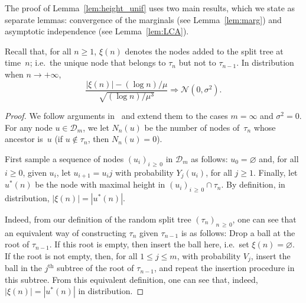 \documentclass[AHL,Unicode,longabstracts,published]{cedram}
\newcommand{\clD}{\mathcal{D}}
\newcommand{\clN}{\mathcal{N}}
\begin{document}
The proof of Lemma~\ref{lem:height_unif} uses two main results, which we state as separate lemmas: convergence of the marginals (see Lemma~\ref{lem:marg}) and asymptotic independence (see Lemma~\ref{lem:LCA}).

\begin{lemm}\label{lem:marg}
Recall that, for all $n\geq 1$, $\xi(n)$ denotes the nodes added to the split tree at time~$n$; i.e.\ the unique node that belongs to $\tau_n$ but not to $\tau_{n-1}$. In distribution when $n\to+\infty$,
\[
\frac{|\xi(n)|-(\log n)/\mu}{\sqrt{(\log n)/\mu^3}}\Rightarrow\clN(0,\sigma^2).
\]
\end{lemm}

\begin{proof}
{We follow arguments in~\cite[Theorem~2]{devroye-split} and extend them to the cases $m=\infty$ and $\sigma^2=0$.} For any node $u\in \clD_m$, we let $N_n(u)$ be the number of nodes of~$\tau_n$ whose ancestor is~$u$ (if $u\notin\tau_n$, then $N_n(u) = 0$).

First sample a sequence of nodes $(u_i)_{i\,\geq\,0}$ in $\clD_m$ as follows: $u_0 = \varnothing$ and, for all $i\geq 0$, given $u_i$, let $u_{i+1} = u_i j$ with probability $Y_j(u_i)$, for all $j\geq 1$. Finally, let $u^*(n)$ be the node with maximal height in $(u_i)_{i\,\geq\,0} \cap \tau_n$. By definition, in distribution, $|\xi(n)| = |u^*(n)|$.

Indeed, from our definition of the random split tree $(\tau_n)_{n\,\geq \,0}$, one can see that an equivalent way of constructing $\tau_n$ given $\tau_{n-1}$ is as follows: Drop a ball at the root of $\tau_{n-1}$. If this root is empty, then insert the ball here, i.e.\ set $\xi(n) = \varnothing$. If the root is not empty, then, for all $1\leq j\leq m$, with probability $V_j$, insert the ball in the $j^{\text{th}}$ subtree of the root of $\tau_{n-1}$, and repeat the insertion procedure in this subtree. From this equivalent definition, one can see that, indeed, $|\xi(n)| = |u^*(n)|$ in distribution.


\end{proof}
\end{document}
